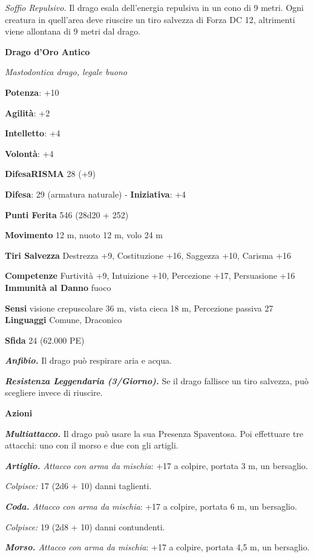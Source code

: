 \begin{multicols}{2}
\emph{Soffio Repulsivo.} Il drago esala dell'energia repulsiva in un
cono di 9 metri. Ogni creatura in quell'area deve riuscire un tiro
salvezza di Forza DC 12, altrimenti viene allontana di 9 metri dal
drago.

\textbf{Drago d'Oro Antico}

\emph{Mastodontica drago, legale buono}

\textbf{Potenza}: +10

\textbf{Agilità}: +2

\textbf{Intelletto}: +4

\textbf{Volontà}: +4

\textbf{DifesaRISMA} 28 (+9)

\textbf{Difesa}: 29 (armatura naturale) - \textbf{Iniziativa}: +4

\textbf{Punti Ferita} 546 (28d20 + 252) 

\textbf{Movimento} 12 m, nuoto 12 m, volo 24 m

\textbf{Tiri Salvezza} Destrezza +9, Costituzione +16, Saggezza +10,
Carisma +16

\textbf{Competenze} Furtività +9, Intuizione +10, Percezione +17,
Persuasione +16 \textbf{Immunità al Danno} fuoco

\textbf{Sensi} visione crepuscolare 36 m, vista cieca 18 m, Percezione passiva
27 \textbf{Linguaggi} Comune, Draconico

\textbf{Sfida} 24 (62.000 PE)\smallskip

\emph{\textbf{Anfibio.}} Il drago può respirare aria e acqua.

\emph{\textbf{Resistenza Leggendaria (3/Giorno).}} Se il drago fallisce
un tiro salvezza, può scegliere invece di riuscire.

\smallskip\textbf{Azioni}

\emph{\textbf{Multiattacco.}} Il drago può usare la sua Presenza
Spaventosa. Poi effettuare tre attacchi: uno con il morso e due con gli
artigli.

\emph{\textbf{Artiglio.} Attacco con arma da mischia}: +17 a colpire,
portata 3 m, un bersaglio.

\emph{Colpisce:} 17 (2d6 + 10) danni taglienti.

\emph{\textbf{Coda.} Attacco con arma da mischia}: +17 a colpire,
portata 6 m, un bersaglio.

\emph{Colpisce:} 19 (2d8 + 10) danni contundenti.

\emph{\textbf{Morso.} Attacco con arma da mischia}: +17 a colpire,
portata 4,5 m, un bersaglio.


\end{multicols}
